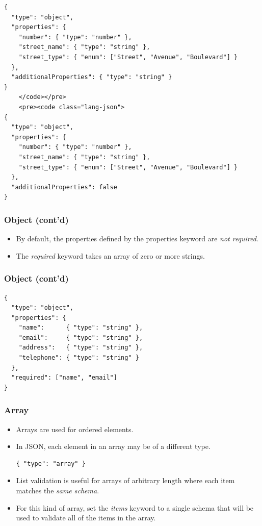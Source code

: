 \documentclass{efd-lecture}
\begin{document}
\begin{frame}[fragile]
  \begin{verbatim}
{
  "type": "object",
  "properties": {
    "number": { "type": "number" },
    "street_name": { "type": "string" },
    "street_type": { "enum": ["Street", "Avenue", "Boulevard"] }
  },
  "additionalProperties": { "type": "string" }
}
    </code></pre>
    <pre><code class="lang-json">
{
  "type": "object",
  "properties": {
    "number": { "type": "number" },
    "street_name": { "type": "string" },
    "street_type": { "enum": ["Street", "Avenue", "Boulevard"] }
  },
  "additionalProperties": false
}
  \end{verbatim}
\end{frame}

\begin{frame}
  \frametitle{Object (cont'd)}
  \begin{itemize}
    \item
      By default, the properties defined by the properties keyword are
      \textit{\color{RubineRed}not required}.
    \item
      The \textit{\color{YellowOrange}required} keyword takes an array of
      zero or more strings.
  \end{itemize}
\end{frame}

\begin{frame}[fragile]
  \frametitle{Object (cont'd)}
  \begin{verbatim}
{
  "type": "object",
  "properties": {
    "name":      { "type": "string" },
    "email":     { "type": "string" },
    "address":   { "type": "string" },
    "telephone": { "type": "string" }
  },
  "required": ["name", "email"]
}
  \end{verbatim}
\end{frame}

\begin{frame}[fragile]
  \frametitle{Array}
  \begin{itemize}
    \item Arrays are used for ordered elements.
    \item In JSON, each element in an array may be of a different type.
    \begin{verbatim}
{ "type": "array" }
    \end{verbatim}
    \item
      List validation is useful for arrays of arbitrary length where each item
      matches the \textit{\color{Yellow} same schema}.
    \item
      For this kind of array, set the
      \textit{\color{YellowOrange} items} keyword to a single schema that
      will be used to validate all of the items in the array.
  \end{itemize}
\end{frame}
\end{document}
